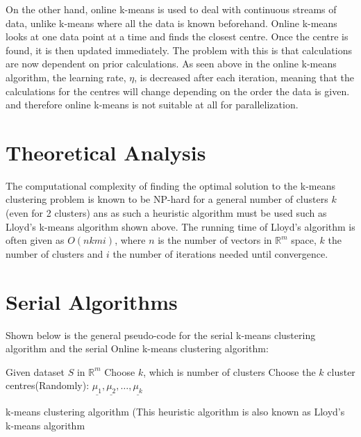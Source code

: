 \documentclass{article}
\begin{document}
On the other hand, online k-means is used to deal with continuous streams of data, unlike k-means where all the data is known beforehand. Online k-means looks at one data point at a time and finds the closest centre. Once the centre is found, it is then updated immediately. The problem with this is that calculations are now dependent on prior calculations. As seen above in the online k-means algorithm, the learning rate, $\eta$, is decreased after each iteration, meaning that the calculations for the centres will change depending on the order the data is given. and therefore online k-means is not suitable at all for parallelization.


\section{Theoretical Analysis}
The computational complexity of finding the optimal solution to the k-means clustering problem is known to be NP-hard for a general number of clusters $k$ (even for 2 clusters) ans as such a heuristic algorithm must be used such as Lloyd's k-means algorithm shown above. The running time of Lloyd's algorithm is often given as $O(nkmi)$, where $n$ is the number of vectors in $\mathbb{R}^m$ space, $k$ the number of clusters and $i$ the number of iterations needed until convergence.


\newpage


\section{Serial Algorithms}
Shown below is the general pseudo-code for the serial k-means clustering algorithm and the serial Online k-means clustering algorithm:

\begin{algorithm}[H]
\SetAlgoLined
 Given dataset $S$ in $\mathbb{R}^m$\;
 Choose $k$, which is number of clusters\;
 Choose the $k$ cluster centres(Randomly): $\underline{\mu_1}, \underline{\mu_2}, \dots, \underline{\mu_k}$\;
 \caption{k-means clustering algorithm (This heuristic algorithm is also known as Lloyd's k-means algorithm}
\end{algorithm}
\end{document}
